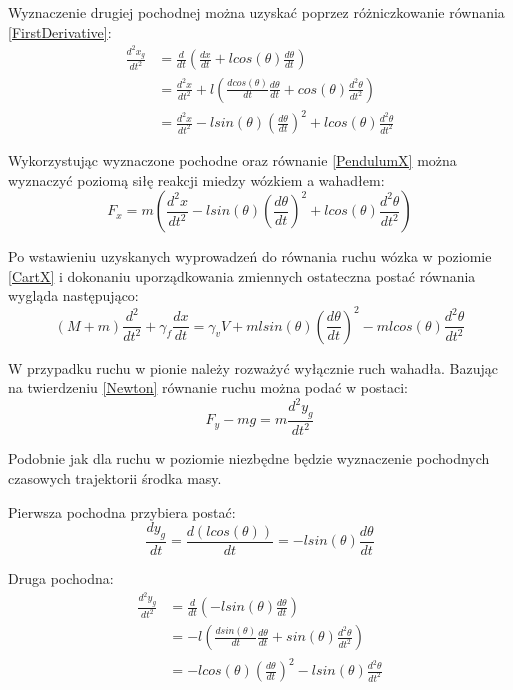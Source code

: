 \documentclass[12pt, oneside]{report}
\theoremstyle{definition}
\begin{document}
Wyznaczenie drugiej pochodnej można uzyskać poprzez różniczkowanie równania \ref{FirstDerivative}:
\begin{equation} \label{Second}
\begin{aligned}
\frac{d^2x_g}{dt^2} &= \frac{d}{dt}(\frac{dx}{dt} + lcos(\theta)\frac{d\theta}{dt})\\
&= \frac{d^2x}{dt^2} + l(\frac{dcos(\theta)}{dt} \frac{d\theta}{dt} + cos(\theta) \frac{d^2\theta}{dt^2})\\
&= \frac{d^2x}{dt^2} - lsin(\theta)(\frac{d\theta}{dt})^2 + lcos(\theta) \frac{d^2\theta}{dt^2}
\end{aligned}
\end{equation}

Wykorzystując wyznaczone pochodne oraz równanie \ref{PendulumX} można wyznaczyć poziomą siłę reakcji miedzy wózkiem a wahadłem:
\begin{equation} \label{ReactionX}
F_x = m (\frac{d^2x}{dt^2} - lsin(\theta)(\frac{d\theta}{dt})^2 + lcos(\theta) \frac{d^2\theta}{dt^2})
\end{equation}

Po wstawieniu uzyskanych wyprowadzeń do równania ruchu wózka w poziomie \ref{CartX} i dokonaniu uporządkowania zmiennych ostateczna postać równania wygląda następująco:
\begin{equation} \label{CartFullX}
(M + m) \frac{d^2}{dt^2} + \gamma_f \frac{dx}{dt} = \gamma_v V + mlsin(\theta)(\frac{d\theta}{dt})^2 - mlcos(\theta) \frac{d^2\theta}{dt^2}
\end{equation}

W przypadku ruchu w pionie należy rozważyć wyłącznie ruch wahadła. Bazując na twierdzeniu \ref{Newton} równanie ruchu można podać w postaci:
\begin{equation} \label{PendulumY}
F_y - mg = m \frac{d^2y_g}{dt^2}
\end{equation}

Podobnie jak dla ruchu w poziomie niezbędne będzie wyznaczenie pochodnych czasowych trajektorii środka masy.

Pierwsza pochodna przybiera postać:
\begin{equation}
\frac{dy_g}{dt} = \frac{d(lcos(\theta))}{dt} = -lsin(\theta) \frac{d\theta}{dt}
\end{equation}

Druga pochodna:
\begin{equation}
\begin{aligned}
\frac{d^2y_g}{dt^2} &= \frac{d}{dt}(-lsin(\theta) \frac{d\theta}{dt})\\
&= -l(\frac{dsin(\theta)}{dt}\frac{d\theta}{dt} + sin(\theta) \frac{d^2\theta}{dt^2})\\
&= -lcos(\theta)(\frac{d\theta}{dt})^2 - lsin(\theta) \frac{d^2\theta}{dt^2}
\end{aligned}
\end{equation}
\end{document}
